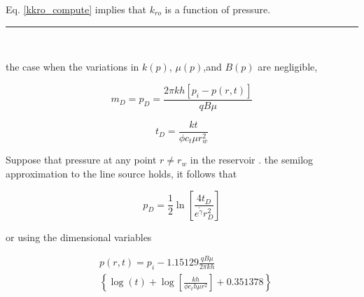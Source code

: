 \documentclass{llncs}
\numberwithin{equation}{section}
\numberwithin{figure}{section}
\numberwithin{table}{section}
\begin{document}
    Eq. \ref{kkro_compute} implies that $k_{ro}$ is a function of pressure.  \\
    \rule{\textwidth}{1pt}\\
    \vspace{15pt}

     the case when the variations in $k(p)$, $\mu(p)$,and $B(p)$ are negligible,

    \begin{equation}
        {{m}_{D}}={{p}_{D}}=\frac{2\pi kh\left[ {{p}_{i}}-p\left( r,t \right) \right]}{qB\mu }
        \label{mD_no_p_var}
    \end{equation}

    \begin{equation}
        {{t}_{D}}=\frac{kt}{\phi {{c}_{t}}\mu r_{w}^{2}}
        \label{tD_no_p_var}
    \end{equation}

    Suppose that pressure at any point $r\neq r_{w}$ in the reservoir .  the semilog approximation to the line source holds, it follows that

    \begin{equation}
        {{p}_{D}}=\frac{1}{2}\ln \left[ \frac{4{{t}_{D}}}{{{e}^{\widetilde{\gamma }}}r_{D}^{2}} \right]
        \label{pD_no_p_var_rD}
    \end{equation}

    or using the dimensional variables 

    \begin{equation}
        \begin{split}
        & p\left( r,t \right)={{p}_{i}}-1.15129\frac{qB\mu }{2\pi kh} \\
        & \left\{ \log \left( t \right)+\log \left[ \frac{{{k}h}}{\phi {{c}_{t}}h\mu r^{2}} \right]+0.351378 \right\} \\
        \end{split}
        \label{p_r_t}
    \end{equation}
\end{document}
